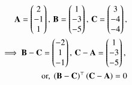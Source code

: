 \begin{align}
\vec{A} = \myvec{2\\-1\\1}, \, \vec{B} = \myvec{1\\-3\\-5}, \, \vec{C}=\myvec{3\\-4\\-4},
\\
\implies \vec{B}-\vec{C} = \myvec{-2\\1\\-1} ,\, 
\vec{C}-\vec{A} = \myvec{1\\-3\\-5} ,\, 
\\
	\text{or, }
\brak{\vec{B}-\vec{C}}^{\top}\brak{\vec{C}-\vec{A}} = 0
\end{align}
